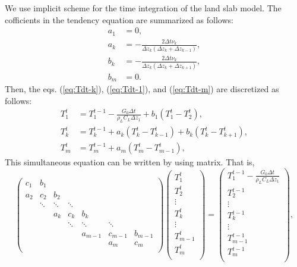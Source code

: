 We use implicit scheme for the time integration of the land slab model.
The cofficients in the tendency equation are summarized as follows:
\begin{align}
  a_{1} &= 0, \\
  a_{k} &= - \frac{2\Delta t \nu_{k}}{\Delta z_{k}(\Delta z_{k}+\Delta z_{k-1})}, \\
  b_{k} &= - \frac{2\Delta t \nu_{k}}{\Delta z_{k}(\Delta z_{k}+\Delta z_{k+1})}, \\
  b_{m} &= 0.
\end{align}
Then, the eqs. (\ref{eq:Tdt-k}), (\ref{eq:Tdt-1}), and (\ref{eq:Tdt-m}) are discretized as follows:
\begin{align}
  T_{1}^{t} &= T_{1}^{t-1} - \frac{G_{0}\Delta t}{\rho_{L}C_{L}\Delta z_{1}} + b_{1} (T_{1}^{t}-T_{2}^{t}), \\
  T_{k}^{t} &= T_{k}^{t-1} + a_{k} (T_{k}^{t}-T_{k-1}^{t}) + b_{k} (T_{k}^{t}-T_{k+1}^{t}), \\
  T_{m}^{t} &= T_{m}^{t-1} + a_{m} (T_{m}^{t}-T_{m-1}^{t}),
\end{align}
This simultaneous equation can be written by using matrix. That is,
\begin{equation}
\begin{pmatrix}
  c_{1}  & b_{1}  &        &        &         &         &         \\
  a_{2}  & c_{2}  & b_{2}  &        &         &         &         \\
         & \ddots & \ddots & \ddots &         &         &         \\
         &        & a_{k}  & c_{k}  & b_{k}   &         &         \\
         &        &        & \ddots & \ddots  & \ddots  &         \\
         &        &        &        & a_{m-1} & c_{m-1} & b_{m-1} \\
         &        &        &        &         & a_{m}   & c_{m}   \\
\end{pmatrix}
\begin{pmatrix}
  T_{1}^{t}   \\
  T_{2}^{t}   \\
  \vdots      \\
  T_{k}^{t}   \\
  \vdots      \\
  T_{m-1}^{t} \\
  T_{m}^{t}   \\
\end{pmatrix}
=
\begin{pmatrix}
  T_{1}^{t-1} - \frac{G_{0}\Delta t}{\rho_{L}C_{L}\Delta z_{1}} \\
  T_{2}^{t-1}   \\
  \vdots        \\
  T_{k}^{t-1}   \\
  \vdots        \\
  T_{m-1}^{t-1} \\
  T_{m}^{t-1}   \\
\end{pmatrix}
,
\end{equation}
